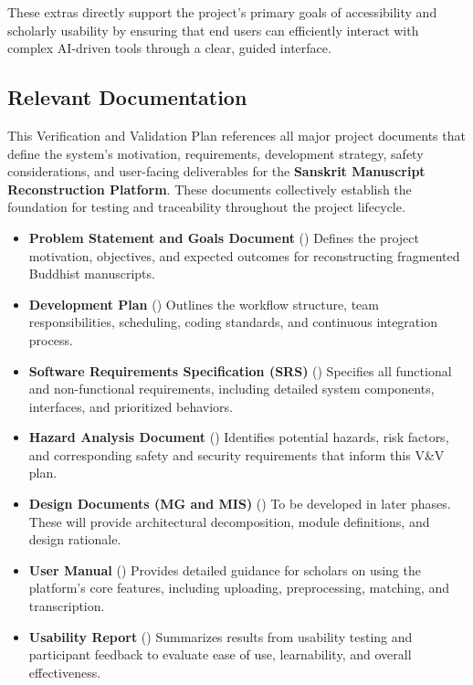 \documentclass[12pt, titlepage]{article}
\begin{document}
These extras directly support the project’s primary goals of accessibility and scholarly usability by ensuring that end users can efficiently interact with complex AI-driven tools through a clear, guided interface.

\subsection{Relevant Documentation}

This Verification and Validation Plan references all major project documents that define the system’s motivation, requirements, development strategy, safety considerations, and user-facing deliverables for the \textbf{Sanskrit Manuscript Reconstruction Platform}. These documents collectively establish the foundation for testing and traceability throughout the project lifecycle.

\begin{itemize}
    \item \textbf{Problem Statement and Goals Document} (\citet{ProblemStatement})  
    Defines the project motivation, objectives, and expected outcomes for reconstructing fragmented Buddhist manuscripts.

    \item \textbf{Development Plan} (\citet{DevelopmentPlan})  
    Outlines the workflow structure, team responsibilities, scheduling, coding standards, and continuous integration process.

    \item \textbf{Software Requirements Specification (SRS)} (\citet{SRS})  
    Specifies all functional and non-functional requirements, including detailed system components, interfaces, and prioritized behaviors.

    \item \textbf{Hazard Analysis Document} (\citet{HazardAnalysis})  
    Identifies potential hazards, risk factors, and corresponding safety and security requirements that inform this V\&V plan.

    \item \textbf{Design Documents (MG and MIS)} (\citet{DesignDocs})  
    To be developed in later phases. These will provide architectural decomposition, module definitions, and design rationale.

    \item \textbf{User Manual} (\citet{UserManual})  
    Provides detailed guidance for scholars on using the platform’s core features, including uploading, preprocessing, matching, and transcription.

    \item \textbf{Usability Report} (\citet{UsabilityReport})  
    Summarizes results from usability testing and participant feedback to evaluate ease of use, learnability, and overall effectiveness.
\end{itemize}
\end{document}
